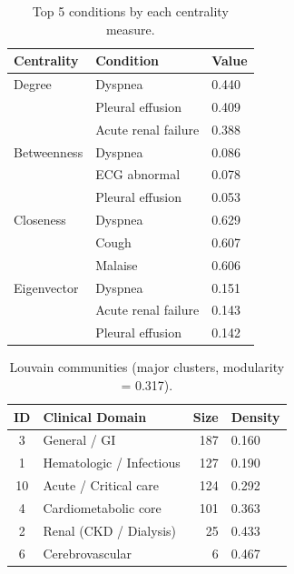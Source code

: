 \documentclass[10pt,twocolumn]{article}
\begin{document}
\begin{table}[!htbp]
\centering
\caption{Top 5 conditions by each centrality measure.}
\label{tab:centrality}
\small
\begin{tabular}{lll}
\toprule
\textbf{Centrality} & \textbf{Condition} & \textbf{Value} \\
\midrule
Degree & Dyspnea & 0.440 \\
 & Pleural effusion & 0.409 \\
 & Acute renal failure & 0.388 \\
Betweenness & Dyspnea & 0.086 \\
 & ECG abnormal & 0.078 \\
 & Pleural effusion & 0.053 \\
Closeness & Dyspnea & 0.629 \\
 & Cough & 0.607 \\
 & Malaise & 0.606 \\
Eigenvector & Dyspnea & 0.151 \\
 & Acute renal failure & 0.143 \\
 & Pleural effusion & 0.142 \\
\bottomrule
\end{tabular}
\end{table}

\begin{table}[!htbp]
\centering
\caption{Louvain communities (major clusters, modularity = 0.317).}
\label{tab:communities}
\small
\begin{tabular}{clrl}
\toprule
\textbf{ID} & \textbf{Clinical Domain} & \textbf{Size} & \textbf{Density} \\
\midrule
3 & General / GI & 187 & 0.160 \\
1 & Hematologic / Infectious & 127 & 0.190 \\
10 & Acute / Critical care & 124 & 0.292 \\
4 & Cardiometabolic core & 101 & 0.363 \\
2 & Renal (CKD / Dialysis) & 25 & 0.433 \\
6 & Cerebrovascular & 6 & 0.467 \\
\bottomrule
\end{tabular}
\end{table}
\end{document}
